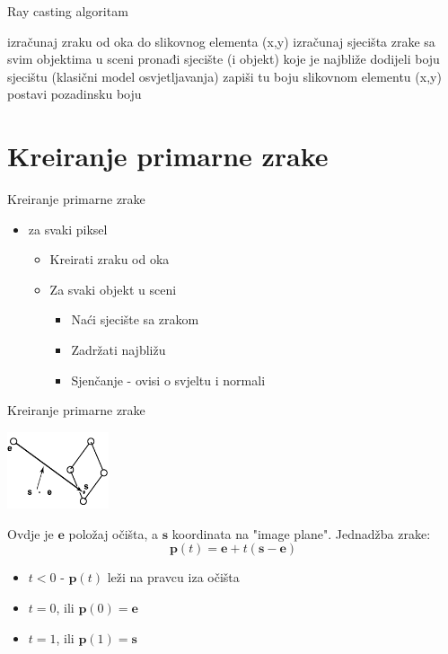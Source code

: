 \documentclass[9pt]{beamer}
\begin{document}
\begin{frame}{Ray casting algoritam}
\begin{algorithm*}[H]
	{
		izračunaj zraku od oka do slikovnog elementa (x,y)\;
		izračunaj sjecišta zrake sa svim objektima u sceni\;
		pronađi sjecište (i objekt) koje je najbliže\;
		{
			dodijeli boju sjecištu (klasični model osvjetljavanja)\;
			zapiši tu boju slikovnom elementu (x,y)\;
		}\Else
		{
			postavi pozadinsku boju\;
		}
	}
\end{algorithm*}
\end{frame}
\section{Kreiranje primarne zrake}
\begin{frame}{Kreiranje primarne zrake}
\begin{itemize}
	\item za svaki piksel
	\begin{itemize}
		\item \alert{Kreirati zraku od oka}
		\item Za svaki objekt u sceni
		\begin{itemize}
			\item Naći sjecište sa zrakom
			\item Zadržati najbližu
			\item Sjenčanje - ovisi o svjeltu i normali
		\end{itemize}
	\end{itemize}
\end{itemize}
\end{frame}

\begin{frame}{Kreiranje primarne zrake}
\begin{center}
\includegraphics[width=3cm]{slike/ray_from_eye.png}
\end{center}
Ovdje je $\textbf{e}$ položaj očišta, a $\textbf{s}$ koordinata na "image plane".
Jednadžba zrake: 
$$\textbf{p}(t) = \textbf{e} + t(\textbf{s} - \textbf{e})$$
\begin{itemize}
\item $t<0$ - $\textbf{p}(t)$ leži na pravcu iza očišta
\item $t=0$, ili $\textbf{p}(0) = \textbf{e}$
\item $t=1$, ili $\textbf{p}(1) = \textbf{s}$
\end{itemize}
\end{frame}
\end{document}
